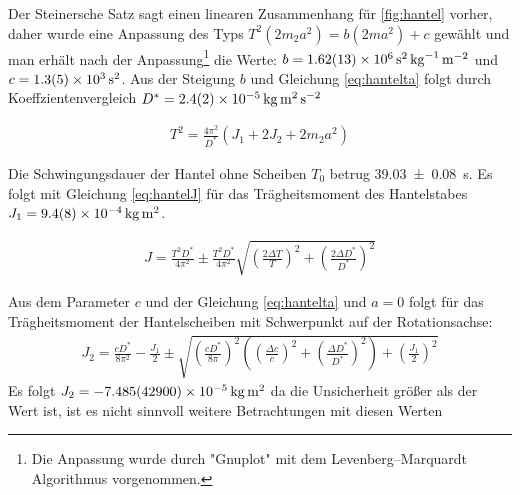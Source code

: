 Der Steinersche Satz sagt einen linearen Zusammenhang für \cref{fig:hantel} vorher, daher wurde eine Anpassung des Typs $T^2(2m_2 a^2)=b (2m a^2)+c$ gewählt und man erhält nach der Anpassung\footnote{Die Anpassung wurde durch "Gnuplot" mit dem Levenberg–Marquardt Algorithmus vorgenommen.  } die Werte: $ b               = \SI{1.62   \pm 0.13 e+006}{\second \squared \per \kilogram \per \metre \squared} $ und $c               = \SI{ 1.3      +-0.5e3 }   {\second \squared}$. Aus der Steigung $b$ und Gleichung \ref{eq:hantelta} folgt durch Koeffzientenvergleich $D^*=\SI{2.4+-0.2e-5}{\kilogram \metre \squared \per \second \squared }$





\begin{align}
	T^2= \frac{4 \pi^2}{D^*}(J_1+2J_2+2m_2 a^2)
	\label{eq:hantelta}
\end{align}



Die Schwingungsdauer der Hantel ohne Scheiben $T_0$  betrug \SI{39,03 \pm 0.08}{s}. Es folgt mit Gleichung \ref{eq:hantelJ} für das Trägheitsmoment des Hantelstabes $J_1 = \SI{9.4 \pm 0.8 e-4}{\kilogram \metre \squared}$.



\begin{align}
	J=\frac{T^2 D^*}{4 \pi^2} \pm \frac{T^2 D^*}{4 \pi^2} \sqrt{
	\left(\frac{2 \Delta T}{T} \right)^2 + 	\left(\frac{2 \Delta D^*}{D^*} \right)^2 }
\label{eq:hantelJ}
\end{align}








Aus dem Parameter $c$ und der Gleichung \ref{eq:hantelta} und $a=0$  folgt für das Trägheitsmoment der Hantelscheiben mit Schwerpunkt auf der Rotationsachse:
\begin{align}
J_2=\frac{c D^*}{8 \pi ^2}-\frac{J_1}{2} \pm \sqrt{\left( \frac{c D^*}{8 \pi}\right) ^2\left( \left( \frac{\Delta c}{c}\right) ^2+  \left( \frac{\Delta D^*}{D^*}\right) ^2\right) + \left(\frac{J_1}{2}\right)^2 }
\end{align}
Es folgt $J_2=\SI{-7.485 \pm 42.9 e-5 }{\kilogram \metre \squared}$ da die Unsicherheit größer als der Wert ist, ist es nicht sinnvoll weitere Betrachtungen mit diesen Werten 




















